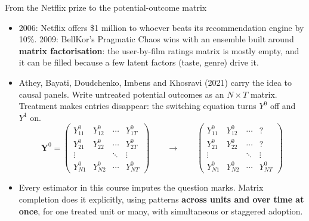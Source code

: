 \documentclass[
  11pt,
  ignorenonframetext,
  aspectratio=169,
]{beamer}
\providecommand{\tightlist}{%
  \setlength{\itemsep}{0pt}\setlength{\parskip}{0pt}}
\begin{document}
\begin{frame}{From the Netflix prize to the potential-outcome matrix}
\protect{}\label{from-the-netflix-prize-to-the-potential-outcome-matrix}
\begin{itemize}
\tightlist
\item
  2006: Netflix offers \$1 million to whoever beats its recommendation
  engine by 10\%. 2009: BellKor's Pragmatic Chaos wins with an ensemble
  built around \textbf{matrix factorisation}: the user-by-film ratings
  matrix is mostly empty, and it can be filled because a few latent
  factors (taste, genre) drive it.
\item
  Athey, Bayati, Doudchenko, Imbens and Khosravi (2021) carry the idea
  to causal panels. Write untreated potential outcomes as an
  \(N \times T\) matrix. Treatment makes entries disappear: the
  switching equation turns \(Y^0\) off and \(Y^1\) on. \[
  \mathbf Y^0 = \begin{pmatrix} Y^0_{11} & Y^0_{12} & \cdots & Y^0_{1T} \\ Y^0_{21} & Y^0_{22} & \cdots & Y^0_{2T} \\ \vdots & & \ddots & \vdots \\ Y^0_{N1} & Y^0_{N2} & \cdots & Y^0_{NT} \end{pmatrix}
  \qquad\longrightarrow\qquad
  \begin{pmatrix} Y^0_{11} & Y^0_{12} & \cdots & ? \\ Y^0_{21} & Y^0_{22} & \cdots & ? \\ \vdots & & \ddots & \vdots \\ Y^0_{N1} & Y^0_{N2} & \cdots & Y^0_{NT} \end{pmatrix}
  \]
\item
  Every estimator in this course imputes the question marks. Matrix
  completion does it explicitly, using patterns \textbf{across units and
  over time at once}, for one treated unit or many, with simultaneous or
  staggered adoption.
\end{itemize}
\end{frame}
\end{document}

